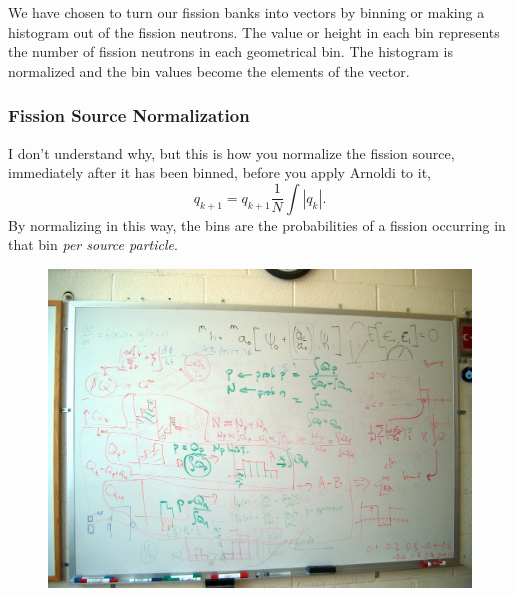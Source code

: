 \documentclass[12pt]{article}
\begin{document}
We have chosen to turn our fission banks into vectors by binning or making a histogram out of the fission neutrons.  The value or height in each bin represents the number of fission neutrons in each geometrical bin.  The histogram is normalized and the bin values become the elements of the vector.

\subsubsection{Fission Source Normalization}
I don't understand why, but this is how you normalize the fission source, immediately after it has been binned, before you apply Arnoldi to it,
\begin{equation}
    q_{k+1} = q_{k+1}\frac{1}{N}\int{\left|q_k\right|}.
\end{equation}
By normalizing in this way, the bins are the probabilities of a fission occurring in that bin \emph{per source particle}.

\begin{figure}[h]
    \includegraphics[width=6in, keepaspectratio]{Whiteboard.jpg}
\end{figure}
\end{document}

